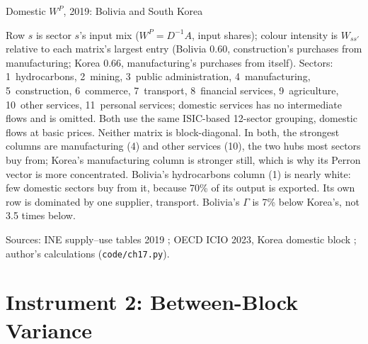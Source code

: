 \documentclass[../structural_economics_book.tex]{subfiles}
\begin{document}
\begin{vizpanel}{Domestic $W^P$, 2019: Bolivia and South Korea}
\begin{center}
\end{center}
\vspace{-0.5em}
\small Row $s$ is sector $s$'s input mix ($W^P = D^{-1}A$, input shares); colour intensity is $W_{ss'}$ relative to each matrix's largest entry (Bolivia $0.60$, construction's purchases from manufacturing; Korea $0.66$, manufacturing's purchases from itself). Sectors: 1~hydrocarbons, 2~mining, 3~public administration, 4~manufacturing, 5~construction, 6~commerce, 7~transport, 8~financial services, 9~agriculture, 10~other services, 11~personal services; domestic services has no intermediate flows and is omitted. Both use the same ISIC-based 12-sector grouping, domestic flows at basic prices. Neither matrix is block-diagonal. In both, the strongest columns are manufacturing (4) and other services (10), the two hubs most sectors buy from; Korea's manufacturing column is stronger still, which is why its Perron vector is more concentrated. Bolivia's hydrocarbons column (1) is nearly white: few domestic sectors buy from it, because 70\% of its output is exported. Its own row is dominated by one supplier, transport. Bolivia's $\Gamma$ is 7\% below Korea's, not 3.5 times below.
\par\footnotesize Sources: INE supply--use tables 2019 \citep{ine2026sut}; OECD ICIO 2023, Korea domestic block \citep{oecd2023icio}; author's calculations (\texttt{code/ch17.py}).
\end{vizpanel}


\section{Instrument 2: Between-Block Variance}
\label{ch17:sec:between}
\end{document}

